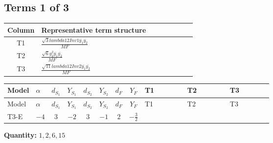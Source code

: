\documentclass[8pt]{article}
\begin{document}
\begin{landscape}
\subsection*{Terms 1 of 3}
\begin{center}
\begin{tabular}{@{}c >{\raggedright\arraybackslash}p{0.82\linewidth}@{}}
\toprule
Column & Representative term structure \\
\midrule
T1 & \(\displaystyle \frac{\sqrt{3} lambda12Inv1 \overline{y_{1}} \overline{y_{2}}}{MF}\) \\
\midrule
T2 & \(\displaystyle \frac{\sqrt{6} g_{2}^{2} \overline{y_{1}} \overline{y_{2}}}{MF}\) \\
\midrule
T3 & \(\displaystyle \frac{\sqrt{11} lambda12Inv2 \overline{y_{1}} \overline{y_{2}}}{MF}\) \\
\midrule
\bottomrule
\end{tabular}
\end{center}
\smallskip
\tiny
\begin{longtable}{@{}llcccccc >{\raggedright\arraybackslash}p{0.21\linewidth} >{\raggedright\arraybackslash}p{0.21\linewidth} >{\raggedright\arraybackslash}p{0.21\linewidth}@{}}
\toprule
Model & $\alpha$ & $d_{S_1}$ & $Y_{S_1}$ & $d_{S_2}$ & $Y_{S_2}$ & $d_F$ & $Y_F$ & T1 & T2 & T3 \\
\midrule
\endfirsthead
\toprule
Model & $\alpha$ & $d_{S_1}$ & $Y_{S_1}$ & $d_{S_2}$ & $Y_{S_2}$ & $d_F$ & $Y_F$ & T1 & T2 & T3 \\
\midrule
\endhead
T3-E & $-4$ & $3$ & $-2$ & $3$ & $-1$ & $2$ & $-\frac{3}{2}$ & \scriptsize\adjustbox{max width=\linewidth}{$\begin{gathered} - \frac{\sqrt{3} lambda12Inv1 \overline{y_{1}} \overline{y_{2}}}{6 MF}\end{gathered}$} & \scriptsize\adjustbox{max width=\linewidth}{$\begin{gathered} \frac{\sqrt{6} g_{2}^{2} \overline{y_{1}} \overline{y_{2}}}{6 MF}\end{gathered}$} & \scriptsize\adjustbox{max width=\linewidth}{$\begin{gathered} \frac{3 \sqrt{11} lambda12Inv2 \overline{y_{1}} \overline{y_{2}}}{22 MF}\end{gathered}$} \\
\midrule
\bottomrule
\end{longtable}
\clearpage
\noindent\textbf{Quantity: }$\mathrm{1,2,6,15}$\par\smallskip

\end{landscape}
\end{document}
